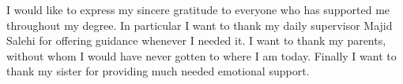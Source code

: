 \documentclass[master=cws,masteroption=ai, english]{kulemt}
\begin{document}
\begin{preface}
I would like to express my sincere gratitude to everyone who has supported me throughout my degree. 
In particular I want to thank my daily supervisor Majid Salehi for offering guidance whenever I needed it. 
I want to thank my parents, without whom I would have never gotten to where I am today.
Finally I want to thank my sister for providing much needed emotional support.
\end{preface}

\tableofcontents

\begin{abstract}
\end{abstract}

\begin{abstract*}
\end{abstract*}


\listoffiguresandtables


\mainmatter 









\backmatter 



\end{document}
